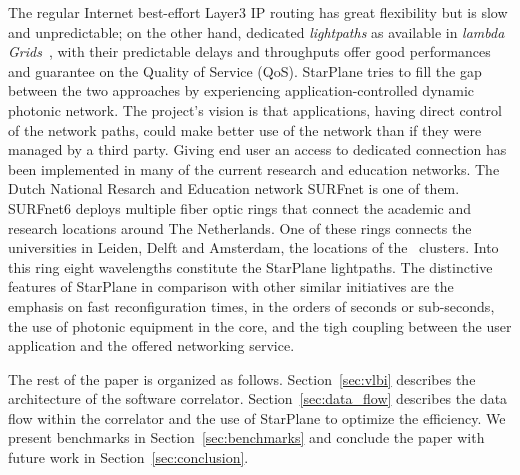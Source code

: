 The regular Internet best-effort Layer3 IP routing has great
flexibility but is slow and unpredictable; on the other hand,
dedicated \textit{lightpaths} as available in \textit{lambda
  Grids}~\cite{eslea-2007}, with their predictable delays and
throughputs offer good performances and guarantee on the Quality of
Service (QoS). StarPlane tries to fill the gap between the two
approaches by experiencing application-controlled dynamic photonic
network. The project's vision is that applications, having direct
control of the network paths, could make better use of the network
than if they were managed by a third party. Giving end user an access
to dedicated connection has been implemented in many of the current
research and education networks. The Dutch National Resarch and
Education network SURFnet is one of them. SURFnet6 deploys multiple
fiber optic rings that connect the academic and research locations
around The Netherlands. One of these rings connects the universities
in Leiden, Delft and Amsterdam, the locations of the \ clusters.
Into this ring eight wavelengths constitute the StarPlane lightpaths.
The distinctive features of StarPlane in comparison with other similar
initiatives are the emphasis on fast reconfiguration times, in the
orders of seconds or sub-seconds, the use of photonic equipment in the
core, and the tigh coupling between the user application and the
offered networking service.

The rest of the paper is organized as follows. Section~\ref{sec:vlbi}
describes the architecture of the software correlator.
Section~\ref{sec:data_flow} describes the data flow within the
correlator and the use of StarPlane to optimize the efficiency. We
present benchmarks in Section~\ref{sec:benchmarks} and conclude the
paper with future work in Section~\ref{sec:conclusion}.

